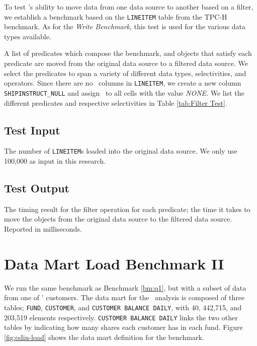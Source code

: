 To test \gap's ability to move data from one data source to another based on a filter, we establish a benchmark based on the \texttt{LINEITEM} table from the TPC-H benchmark. As for the \textit{Write Benchmark}, this test is used for the various data types available.

A list of predicates which compose the benchmark, and objects that satisfy each predicate are moved from the original data source to a filtered data source. We select the predicates to span a variety of different data types, selectivities, and operators. Since there are no \nul~columns in \texttt{LINEITEM}, we create a new column \texttt{SHIPINSTRUCT\_NULL} and assign \nul~to all cells with the value \textit{NONE}. We list the different predicates and respective selectivities in Table \ref{tab:Filter Test}.

\subsection{Test Input}
\label{sub:Test Input}
The number of \texttt{LINEITEM}s loaded into the original data source. We only use 100,000 as input in this research.

\subsection{Test Output}
\label{sub:Test Output}
The timing result for the filter operation for each predicate; the time it takes to move the objects from the original data source to the filtered data source. Reported in milliseconds.

\section{Data Mart Load Benchmark II}
\label{bm:odin-load}


We run the same benchmark as Benchmark \ref{bm:q1}, but with a subset of data from one of \genus' customers. The data mart for the \gd~analysis is composed of three tables; \texttt{FUND}, \texttt{CUSTOMER}, and \texttt{CUSTOMER BALANCE DAILY}, with 40, 442,715, and 203,519 elements respectively. \texttt{CUSTOMER BALANCE DAILY} links the two other tables by indicating how many shares each customer has in each fund. Figure \ref{fig:odin-load} shows the data mart definition for the benchmark.


